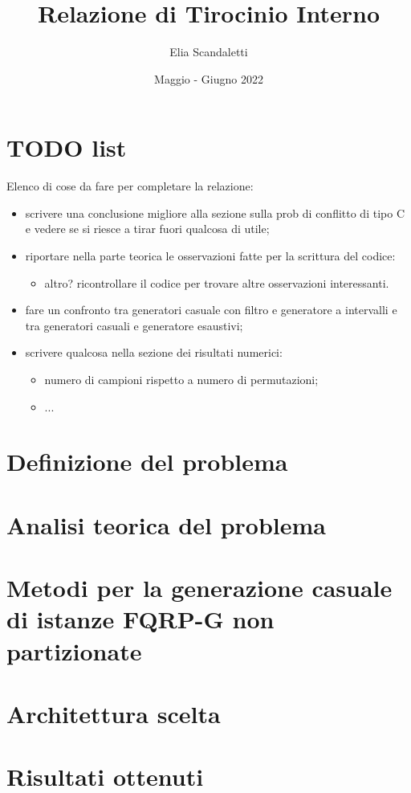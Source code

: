 

\title{Relazione di Tirocinio Interno}
\author{Elia Scandaletti}
\date{Maggio - Giugno 2022}



\maketitle
\tableofcontents

\section*{TODO list}
Elenco di cose da fare per completare la relazione:
\begin{itemize}
    \item scrivere una conclusione migliore alla sezione sulla prob di conflitto di tipo C e vedere se si riesce a tirar fuori qualcosa di utile;
    \item riportare nella parte teorica le osservazioni fatte per la scrittura del codice:
          \begin{itemize}
              \item altro? ricontrollare il codice per trovare altre osservazioni interessanti.
          \end{itemize}
    \item fare un confronto tra generatori casuale con filtro e generatore a intervalli e tra generatori casuali e generatore esaustivi;
    \item scrivere qualcosa nella sezione dei risultati numerici:
          \begin{itemize}
              \item numero di campioni rispetto a numero di permutazioni;
              \item ...
          \end{itemize}
\end{itemize}

\section{Definizione del problema}


\section{Analisi teorica del problema}


\section{Metodi per la generazione casuale di istanze FQRP-G non partizionate}


\section{Architettura scelta}


\section{Risultati ottenuti}


